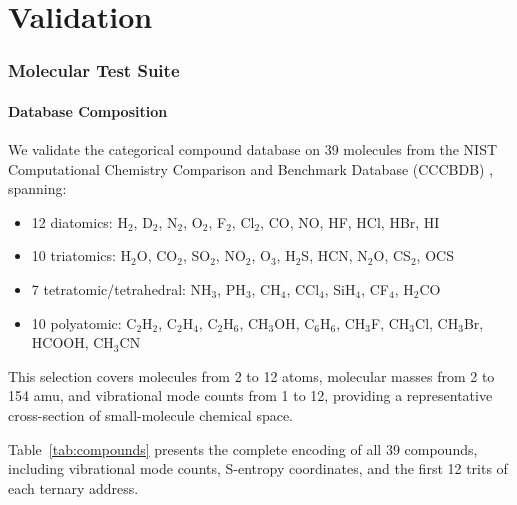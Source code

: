 \documentclass[11pt,a4paper]{article}
\theoremstyle{definition}
\theoremstyle{remark}
\begin{document}

\part{Validation}

\section{Molecular Test Suite}
\label{sec:test_suite}

\subsection{Database Composition}

We validate the categorical compound database on 39 molecules from the NIST Computational Chemistry Comparison and Benchmark Database (CCCBDB) \citep{johnson2022}, spanning:

\begin{itemize}[nosep]
\item 12 diatomics: H$_2$, D$_2$, N$_2$, O$_2$, F$_2$, Cl$_2$, CO, NO, HF, HCl, HBr, HI
\item 10 triatomics: H$_2$O, CO$_2$, SO$_2$, NO$_2$, O$_3$, H$_2$S, HCN, N$_2$O, CS$_2$, OCS
\item 7 tetratomic/tetrahedral: NH$_3$, PH$_3$, CH$_4$, CCl$_4$, SiH$_4$, CF$_4$, H$_2$CO
\item 10 polyatomic: C$_2$H$_2$, C$_2$H$_4$, C$_2$H$_6$, CH$_3$OH, C$_6$H$_6$, CH$_3$F, CH$_3$Cl, CH$_3$Br, HCOOH, CH$_3$CN
\end{itemize}

This selection covers molecules from 2 to 12 atoms, molecular masses from 2 to 154 amu, and vibrational mode counts from 1 to 12, providing a representative cross-section of small-molecule chemical space.

Table~\ref{tab:compounds} presents the complete encoding of all 39 compounds, including vibrational mode counts, S-entropy coordinates, and the first 12 trits of each ternary address.
\end{document}
